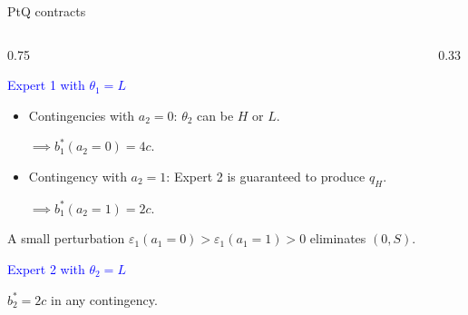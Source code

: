 \documentclass[10pt,aspectratio=169, compressed]{beamer}
\begin{document}
\begin{frame}[t]{PtQ contracts}

\begin{columns}[T,onlytextwidth]
    \begin{column}{0.75\textwidth}
    

\textcolor{blue}{Expert 1 with $\theta_1 = L$}
    
    \smallskip 
    
    \begin{itemize}
\item Contingencies with $a_2 = 0$: $\theta_2$ can be $H$ or $L$.
\smallskip

  $ \implies b_1^*(a_2 \!=\! 0) = 4c$.

\item
Contingency with $a_2=1$: Expert 2 is guaranteed to produce $q_H$.

\smallskip

  $ \implies b_1^*(a_2 \!=\! 1) = 2c$.
    \end{itemize}
    
    \medskip

A small perturbation {\small $\varepsilon_1(a_1\!=\!0) > \varepsilon_1(a_1\!=\!1) > 0$}
eliminates $(0,S)$.


\bigskip

\medskip

\textcolor{blue}{Expert 2 with $\theta_2 = L$}

\smallskip
$b_2^* = 2c$ in any contingency.




 
    \end{column}

    \begin{column}{0.33\textwidth}
        \centering
        \setlength{\tabcolsep}{8pt}
        \renewcommand{\arraystretch}{1.2}
\\[5pt]
\\[15pt]


\end{column}
\end{columns}
\end{frame}
\end{document}

